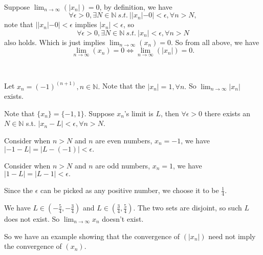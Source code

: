 \documentclass[12pt]{article}%
\begin{document}
~\

Suppose $\lim_{n \to \infty} (|x_n|) =0$, by definition, we have $$\forall \epsilon>0, \exists N \in \mathbb{N} ~s.t.~ ||x_n|-0|<\epsilon, \forall n>N,$$ note that $||x_n|-0|<\epsilon$ implies $|x_n|<\epsilon$, so $$\forall \epsilon>0, \exists N \in \mathbb{N} ~s.t.~ |x_n|<\epsilon, \forall n>N$$ also holds. Which is just implies $\lim_{n \to \infty} (x_n) =0$. So from all above, we have $$\lim_{n \to \infty} (x_n) =0 \iff \lim_{n \to \infty} (|x_n|) =0.$$

~\

Let $x_n = (-1)^{(n+1)}, n \in \mathbb{N}.$ Note that the $|x_n|=1, \forall n.$ So $\lim_{n \to \infty}|x_n|$ exists. 

Note that $\{x_n\}=\{-1,1\}.$ Suppose $x_n$'s limit is $L$, then $\forall \epsilon>0$ there exists an $N \in \mathbb{N}$ s.t. $|x_n-L|<\epsilon, \forall n>N.$

Consider when $n>N$ and $n$ are even numbers, $x_n=-1$, we have $|-1-L|=|L-(-1)|<\epsilon.$

Consider when $n>N$ and $n$ are odd numbers, $x_n=1$, we have $|1-L|=|L-1|<\epsilon.$

Since the $\epsilon$ can be picked as any positive number, we choose it to be $\frac{1}{4}.$

We have $L \in (-\frac{5}{4},-\frac{3}{4})$ and $L \in (\frac{3}{4},\frac{5}{4}).$ The two sets are disjoint, so such $L$ does not exist. So $\lim_{n \to \infty}x_n$ doesn't exist.

So we have an example showing that the convergence of $(|x_n|)$ need not imply the convergence of $(x_n).$
\end{document}
